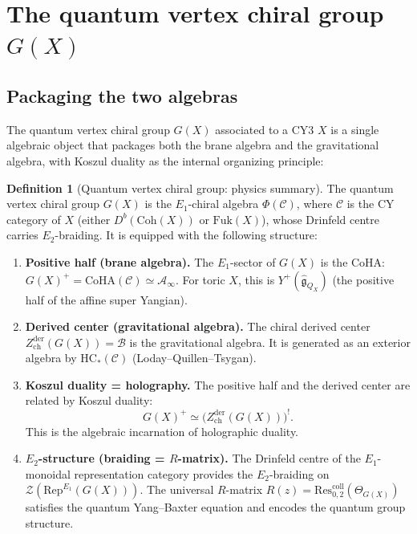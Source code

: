 \documentclass[11pt]{article}
\theoremstyle{definition}
\newtheorem{definition}[theorem]{Definition}
\theoremstyle{remark}
\newcommand{\HC}{\mathrm{HC}}
\newcommand{\Rep}{\mathrm{Rep}}
\newcommand{\Coh}{\mathrm{Coh}}
\newcommand{\Fuk}{\mathrm{Fuk}}
\newcommand{\CoHA}{\mathrm{CoHA}}
\newcommand{\cA}{\mathcal{A}}
\newcommand{\cB}{\mathcal{B}}
\newcommand{\cC}{\mathcal{C}}
\newcommand{\cZ}{\mathcal{Z}}
\newcommand{\frakg}{\mathfrak{g}}
\newcommand{\Eone}{E_1}
\newcommand{\Etwo}{E_2}
\begin{document}
\section{The quantum vertex chiral group $G(X)$}
\label{sec:qvcg}

\subsection{Packaging the two algebras}

The quantum vertex chiral group $G(X)$ associated to a CY3 $X$ is a single
algebraic object that packages both the brane algebra and the gravitational
algebra, with Koszul duality as the internal organizing principle:

\begin{definition}[Quantum vertex chiral group: physics summary]
\label{def:gx-physics}
The quantum vertex chiral group $G(X)$ is the $\Eone$-chiral algebra
$\Phi(\cC)$, where $\cC$ is the CY category of $X$ (either $D^b(\Coh(X))$ or
$\Fuk(X)$), whose Drinfeld centre carries $\Etwo$-braiding.
It is equipped with the following structure:
\begin{enumerate}[label=(\roman*)]
 \item \textbf{Positive half (brane algebra).} The $E_1$-sector of $G(X)$ is
 the CoHA: $G(X)^+ = \CoHA(\cC) \simeq \cA_\infty$. For toric $X$, this
 is $Y^+(\widehat{\frakg}_{Q_X})$ (the positive half of the affine super
 Yangian).

 \item \textbf{Derived center (gravitational algebra).} The chiral derived
 center $Z^{\mathrm{der}}_{\mathrm{ch}}(G(X)) = \cB$ is the gravitational
 algebra. It is generated as an exterior algebra by $\HC_*(\cC)$
 (Loday--Quillen--Tsygan).

 \item \textbf{Koszul duality = holography.} The positive half and the
 derived center are related by Koszul duality:
 \[
 G(X)^+ \simeq \bigl(Z^{\mathrm{der}}_{\mathrm{ch}}(G(X))\bigr)^!.
 \]
 This is the algebraic incarnation of holographic duality.

 \item \textbf{$E_2$-structure (braiding = $R$-matrix).} The
 Drinfeld centre of the $\Eone$-monoidal representation category
 provides the $\Etwo$-braiding on $\cZ(\Rep^{E_1}(G(X)))$.
 The universal $R$-matrix
 $R(z) = \mathrm{Res}^{\mathrm{coll}}_{0,2}(\Theta_{G(X)})$
 satisfies the quantum Yang--Baxter equation and encodes the quantum group
 structure.
\end{enumerate}
\end{definition}
\end{document}
